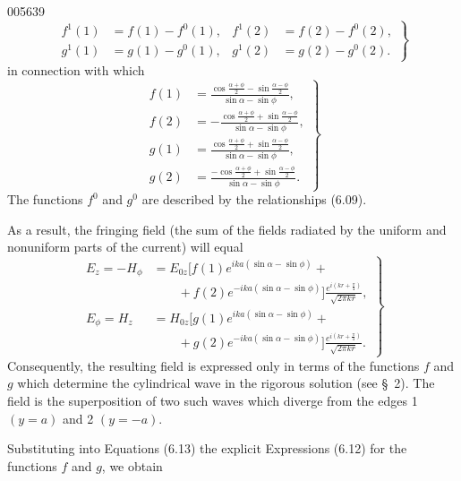 \begin{scanpage}{0056}{39}
\[\left.\begin{aligned}f^1(1)&=f(1)-f^0(1),&f^1(2)&=f(2)-f^0(2),\\g^1(1)&=g(1)-g^0(1),&g^1(2)&=g(2)-g^0(2).\end{aligned}\right\}\tag{6.11}\]
in connection with which
\[\left.\begin{aligned}f(1)&=\frac{\cos\frac{\alpha+\phi}{2}-\sin\frac{\alpha-\phi}{2}}{\sin\alpha-\sin\phi},\\f(2)&=-\frac{\cos\frac{\alpha+\phi}{2}+\sin\frac{\alpha-\phi}{2}}{\sin\alpha-\sin\phi},\\g(1)&=\frac{\cos\frac{\alpha+\phi}{2}+\sin\frac{\alpha-\phi}{2}}{\sin\alpha-\sin\phi},\\g(2)&=\frac{-\cos\frac{\alpha+\phi}{2}+\sin\frac{\alpha-\phi}{2}}{\sin\alpha-\sin\phi}.\end{aligned}\right\}\tag{6.12}\]
The functions $f^0$ and $g^0$ are described by the relationships (6.09).

As a result, the fringing field (the sum of the fields radiated by the uniform and nonuniform parts of the current) will equal
\[\left.\begin{aligned}E_z=-H_\phi&=E_{0z}[f(1)e^{ika(\sin\alpha-\sin\phi)}+\\&\qquad+f(2)e^{-ika(\sin\alpha-\sin\phi)}]\frac{e^{i(kr+\frac\pi4)}}{\sqrt{2\pi kr}},\\E_\phi=H_z&=H_{0z}[g(1)e^{ika(\sin\alpha-\sin\phi)}+\\&\qquad+g(2)e^{-ika(\sin\alpha-\sin\phi)}]\frac{e^{i(kr+\frac\pi4)}}{\sqrt{2\pi kr}}.\end{aligned}\right\}\tag{6.13}\]
Consequently, the resulting field is expressed only in terms of the functions $f$ and $g$ which determine the cylindrical wave in the rigorous solution (see \S\ 2). The field is the superposition of two such waves which diverge from the edges 1 $(y=a)$ and 2 $(y=-a)$.

Substituting into Equations (6.13) the explicit Expressions (6.12) for the functions $f$ and $g$, we obtain
\end{scanpage}
